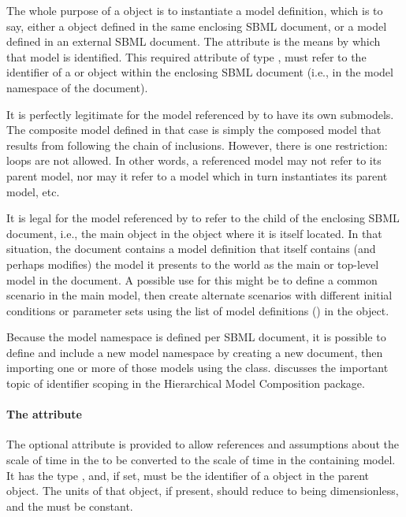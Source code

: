 The whole purpose of a \Submodel object is to instantiate a model
definition, which is to say, either a \Model object defined in the same
enclosing SBML document, or a model defined in an external SBML
document.  The  attribute is the means by which that
model is identified.  This required attribute of type ,
must refer to the identifier of a \Model or \ExternalModelDefinition
object within the enclosing SBML document (i.e., in the model namespace
of the document).

It is perfectly legitimate for the model referenced by 
to have its own submodels.  The composite model defined in that case is
simply the composed model that results from following the chain of
inclusions.  However, there is one restriction: loops are not allowed.
In other words, a referenced model may not refer to its parent model,
nor may it refer to a model which in turn instantiates its parent model,
etc.

It is legal for the model referenced by  to refer to the
 child of the enclosing SBML document, i.e., the main
\Model object in the \SBML object where it is itself located.  In that
situation, the document contains a model definition that itself contains
(and perhaps modifies) the model it presents to the world as the main or
top-level model in the document.  A possible use for this might be to
define a common scenario in the main model, then create alternate
scenarios with different initial conditions or parameter sets using the
list of model definitions () in the \SBML
object.

Because the model namespace is defined per SBML document, it is possible
to define and include a new model namespace by creating a new document,
then importing one or more of those models using the
\ExternalModelDefinition class.   discusses the
important topic of identifier scoping in the Hierarchical Model
Composition package.


\paragraph{The \fixttspace{} attribute}
\label{submodel-timeconversionfactor}

The optional  attribute is provided to allow
references and assumptions about the scale of time in the \Submodel to be converted to 
the scale of time in the containing model.  It has the type ,
and, if set, must be the identifier of a \Parameter object in the 
parent \Model object.  The units of that \Parameter object, if present,
should reduce to being dimensionless, and the \Parameter must be constant.

